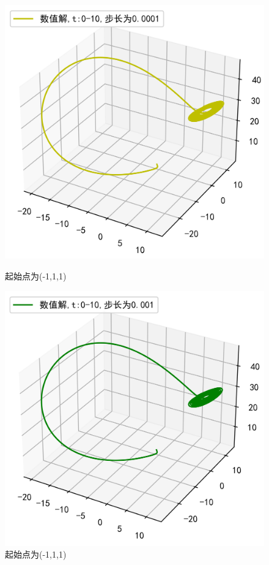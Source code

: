 \documentclass[a4paper]{article}%
\begin{document}
\begin{figure}[h]
    \begin{minipage}{0.48\linewidth}
    \centering
    \includegraphics[scale=0.65]{41}
    \caption{起始点为(-1,1,1)}
    \end{minipage}
    \begin{minipage}{0.48\linewidth}
    \centering
    \includegraphics[scale=0.65]{42}
    \caption{起始点为(-1,1,1)}
    \end{minipage}
\end{figure}
\end{document}
